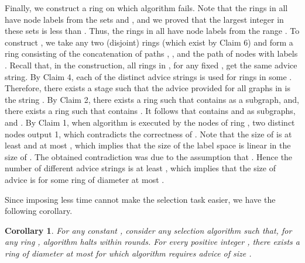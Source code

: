 \documentclass[11pt]{article}
\newtheorem{corollary}{Corollary}[section]
\newcommand{\qed}{\hfill  \bigbreak}
\newenvironment{proof}{\noindent {\bf Proof.}}{\qed}
\begin{document}
\begin{proof}
Finally, we construct a ring  on which algorithm  fails. Note that the rings in  all have node labels from the sets  and , and we proved that the largest integer in these sets is less than . Thus, the rings in  all have node labels from  the range . To construct , we take any two (disjoint) rings  (which exist by Claim 6) and form a ring  consisting of the concatenation of paths , , and the path of  nodes with labels . Recall that, in the construction, all rings in , for any fixed , get the same advice string.   
By Claim 4, each of the  distinct advice strings is used for rings in some . Therefore, there exists a stage  such that the advice provided for all graphs in  is the string . By Claim 2, there exists a ring  such that  contains  as a subgraph, and, there exists a ring  such that  contains . It follows that  contains  and  as subgraphs, and . By Claim 1, when algorithm  is executed by the nodes of ring , two distinct nodes output 1, which contradicts the correctness of . Note that the size of  is at least  and at most , which implies that the size of the label space is linear in the size of . The obtained contradiction was due to the assumption that . Hence the number  of different advice strings is at least , which implies that the size of advice is
 for some ring of diameter at most .
\end{proof}

Since imposing less time cannot make the selection task easier, we have the following corollary.

\begin{corollary}\label{cor}
For any constant ,
consider any selection algorithm  such that, for any ring , algorithm  halts within  rounds.  For every positive integer , there exists a ring  of diameter at most  for which algorithm  requires advice of size .
\end{corollary}
\end{document}
